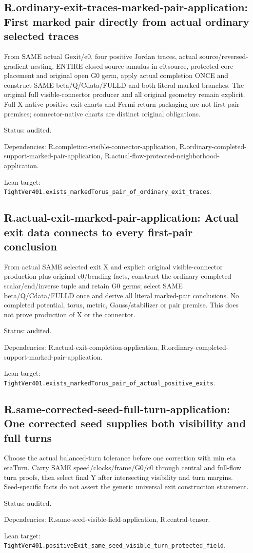 \documentclass{article}
\begin{document}
\subsection*{R.ordinary-exit-traces-marked-pair-application: First marked pair directly from actual ordinary selected traces}
From SAME actual Gexit/e0, four positive Jordan traces, actual source/reversed-gradient nesting, ENTIRE closed source annulus in e0.source, protected core placement and original open G0 germ, apply actual completion ONCE and construct SAME beta/Q/Cdata/FULLD and both literal marked branches. The original full visible-connector producer and all original geometry remain explicit. Full-X native positive-exit charts and Fermi-return packaging are not first-pair premises; connector-native charts are distinct original obligations.
\par Status: audited.
\par Dependencies: R.completion-visible-connector-application, R.ordinary-completed-support-marked-pair-application, R.actual-flow-protected-neighborhood-application.
\par Lean target: \texttt{TightVer401.exists\_markedTorus\_pair\_of\_ordinary\_exit\_traces}.
\subsection*{R.actual-exit-marked-pair-application: Actual exit data connects to every first-pair conclusion}
From actual SAME selected exit X and explicit original visible-connector production plus original c0/bending facts, construct the ordinary completed scalar/end/inverse tuple and retain G0 germs; select SAME beta/Q/Cdata/FULLD once and derive all literal marked-pair conclusions. No completed potential, torus, metric, Gauss/stabilizer or pair premise. This does not prove production of X or the connector.
\par Status: audited.
\par Dependencies: R.actual-exit-completion-application, R.ordinary-completed-support-marked-pair-application.
\par Lean target: \texttt{TightVer401.exists\_markedTorus\_pair\_of\_actual\_positive\_exits}.
\subsection*{R.same-corrected-seed-full-turn-application: One corrected seed supplies both visibility and full turns}
Choose the actual balanced-turn tolerance before one correction with min eta etaTurn. Carry SAME speed/clocks/frame/G0/c0 through central and full-flow turn proofs, then select final Y after intersecting visibility and turn margins. Seed-specific facts do not assert the generic universal exit construction statement.
\par Status: audited.
\par Dependencies: R.same-seed-visible-field-application, R.central-tensor.
\par Lean target: \texttt{TightVer401.positiveExit\_same\_seed\_visible\_turn\_protected\_field}.
\end{document}
